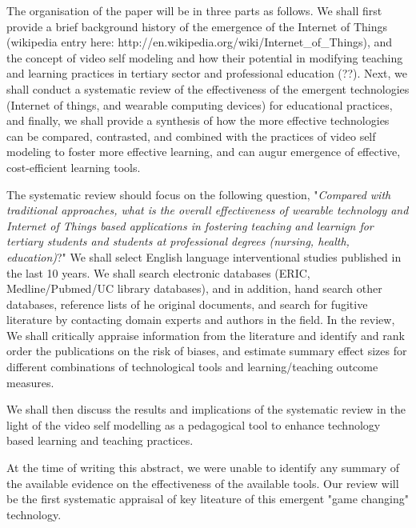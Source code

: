 The organisation of the paper will be in three parts as follows. We shall first provide a brief background history of the emergence of the Internet of Things (wikipedia entry here: http://en.wikipedia.org/wiki/Internet_of_Things), and the concept of video self modeling and how their potential in modifying teaching and learning practices in tertiary sector and professional education (??). Next, we shall conduct a systematic review of the effectiveness of the emergent technologies (Internet of things, and wearable computing devices) for educational practices, and finally, we shall provide a synthesis of how the more effective technologies can be compared, contrasted, and combined with the practices of video self modeling to foster more effective learning, and can augur emergence of effective, cost-efficient learning tools.

The systematic review should focus on the following question, "\textit{Compared with traditional approaches, what is the overall effectiveness of wearable technology and Internet of Things based applications in fostering teaching and learnign for tertiary students and students at professional degrees (nursing, health, education)}?" We shall select English language interventional studies published in the last 10 years. We shall search electronic databases (ERIC, Medline/Pubmed/UC library databases), and in addition,  hand search other databases, reference lists of he original documents, and search for fugitive literature by contacting domain experts and authors in the field. In the review, We shall critically appraise information from the literature and identify and rank order the publications on the risk of biases, and estimate summary effect sizes for different combinations of technological tools and learning/teaching outcome measures. 

We shall then discuss the results and implications of the systematic review in the light of the video self modelling as a pedagogical tool to enhance technology based learning and teaching practices. 

At the time of writing this abstract, we were unable to identify any summary of the available evidence on the effectiveness of the available tools. Our review will be the first systematic appraisal of key liteature of this emergent "game changing" technology. 
